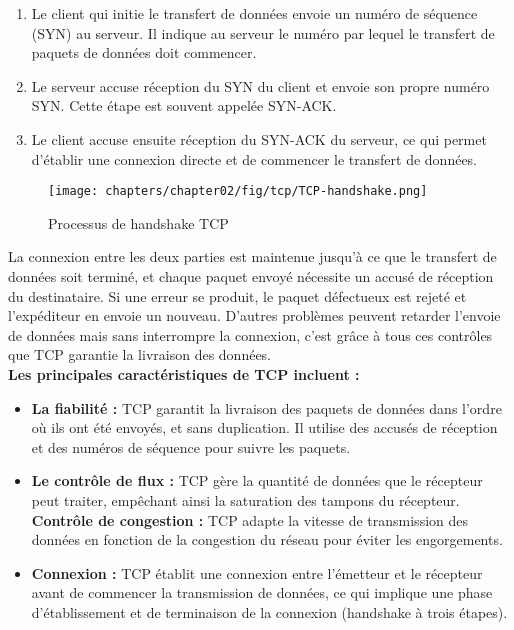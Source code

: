 \begin{enumerate}
    \item Le client qui initie le transfert de données envoie un numéro de séquence (SYN) au serveur. Il indique au serveur le numéro par lequel le transfert de paquets de données doit commencer.
    \item Le serveur accuse réception du SYN du client et envoie son propre numéro SYN. Cette étape est souvent appelée SYN-ACK.
    \item Le client accuse ensuite réception du SYN-ACK du serveur, ce qui permet d’établir une connexion directe et de commencer le transfert de données.
\end{enumerate}

\begin{figure}[H]
    \centering
    \texttt{[image: chapters/chapter02/fig/tcp/TCP-handshake.png]}
    \caption{Processus de handshake TCP\cite{gorman-2023}}
    \label{fig:gen}
\end{figure}

La connexion entre les deux parties est maintenue jusqu’à ce que le transfert de données soit terminé, et chaque paquet envoyé nécessite un accusé de réception du destinataire. Si une erreur se produit, le paquet défectueux est rejeté et l’expéditeur en envoie un nouveau. D'autres problèmes peuvent retarder l’envoie de données mais sans interrompre la connexion, c'est grâce à tous ces contrôles que TCP garantie la livraison des données.\\

\textbf{Les principales caractéristiques de TCP incluent :}
\begin{itemize}
    \item \textbf{La fiabilité :} TCP garantit la livraison des paquets de données dans l'ordre où ils ont été envoyés, et sans duplication. Il utilise des accusés de réception et des numéros de séquence pour suivre les paquets.
    \item \textbf{Le contrôle de flux :} TCP gère la quantité de données que le récepteur peut traiter, empêchant ainsi la saturation des tampons du récepteur.
    \textbf{Contrôle de congestion :} TCP adapte la vitesse de transmission des données en fonction de la congestion du réseau pour éviter les engorgements. 
    \item \textbf{Connexion :} TCP établit une connexion entre l'émetteur et le récepteur avant de commencer la transmission de données, ce qui implique une phase d'établissement et de terminaison de la connexion (handshake à trois étapes).
\end{itemize}

